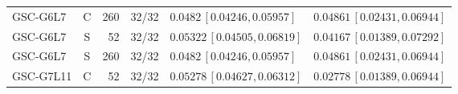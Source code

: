 \documentclass[10pt,a4paper]{article}
\begin{document}
\begin{longtable}{lcrcp{44mm}p{44mm}}
GSC-G6L7 & C & 260 & 32/32 & \(0.0482\,[0.04246,0.05957]\) & \(0.04861\,[0.02431,0.06944]\)\\
GSC-G6L7 & S & 52 & 32/32 & \(0.05322\,[0.04505,0.06819]\) & \(0.04167\,[0.01389,0.07292]\)\\
GSC-G6L7 & S & 260 & 32/32 & \(0.0482\,[0.04246,0.05957]\) & \(0.04861\,[0.02431,0.06944]\)\\
GSC-G7L11 & C & 52 & 32/32 & \(0.05278\,[0.04627,0.06312]\) & \(0.02778\,[0.01389,0.06944]\)\\

\end{longtable}
\end{document}
